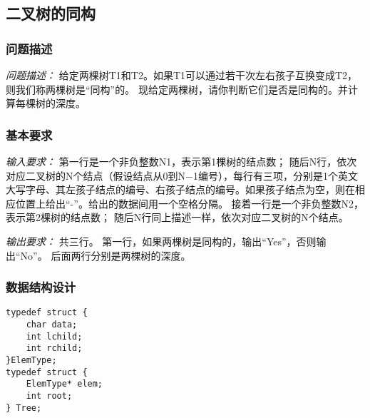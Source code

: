 \documentclass[a4paper,11pt]{article}%
\newenvironment{shadedquotation}
 {\begin{shaded*}
  \quoting[leftmargin=0pt, vskip=0pt]
 }
 {\endquoting
 \end{shaded*}
}
\begin{document}
\subsection{二叉树的同构}
\subsubsection{问题描述}
\begin{shadedquotation}
    \emph{问题描述：}
    给定两棵树T1和T2。如果T1可以通过若干次左右孩子互换变成T2，则我们称两棵树是“同构”的。
    现给定两棵树，请你判断它们是否是同构的。并计算每棵树的深度。
\end{shadedquotation}
\subsubsection{基本要求}
\begin{shadedquotation}
    \emph{输入要求：}
    第一行是一个非负整数N1，表示第1棵树的结点数；
随后N行，依次对应二叉树的N个结点（假设结点从0到N−1编号），每行有三项，分别是1个英文大写字母、其左孩子结点的编号、右孩子结点的编号。如果孩子结点为空，则在相应位置上给出“-”。给出的数据间用一个空格分隔。
接着一行是一个非负整数N2，表示第2棵树的结点数；
随后N行同上描述一样，依次对应二叉树的N个结点。
\end{shadedquotation}
\begin{shadedquotation}
    \emph{输出要求：}
    共三行。
第一行，如果两棵树是同构的，输出“Yes”，否则输出“No”。
后面两行分别是两棵树的深度。
\end{shadedquotation}
\subsubsection{数据结构设计}
\begin{lstlisting}[language={[ANSI]C},keywordstyle=\color{blue!70},commentstyle=\color{red!50!green!50!blue!50},frame=shadowbox,
				rulesepcolor=\color{red!20!green!20!blue!20}]
typedef struct {
    char data;
    int lchild;
    int rchild;
}ElemType;
typedef struct {
    ElemType* elem;
    int root;
} Tree;
\end{lstlisting}
\end{document}
